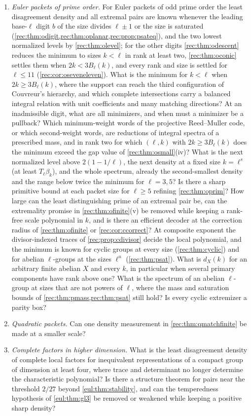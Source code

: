 \begin{enumerate}
\item \emph{Euler packets of prime order.} For Euler packets of odd prime order the least disagreement density and all extremal pairs are known
whenever the leading base-$\ell$ digit $b$ of the size divides $\ell\pm1$ or the size is saturated
(\cref{rec:thm:odigit,rec:thm:oplanar,rec:prop:psateq}), and the two lowest normalized levels by \cref{rec:thm:olevel}; for the other
digits \cref{rec:thm:odescent} reduces the minimum to sizes $k<\ell$ in rank at least two, \cref{rec:thm:oconic} settles
them when $2k<3B_\ell(k)$, and every rank and size is settled for $\ell\le11$ (\cref{rec:cor:oseveneleven}). What is the
minimum for $k<\ell$ when $2k\ge3B_\ell(k)$, where the support can reach the third configuration of Couvreur's
hierarchy, and which complete intersections carry a balanced integral relation with unit coefficients and
many matching directions? At an inadmissible digit, what are all minimizers, and when must a minimizer be a
pullback? Which minimum-weight words of the projective Reed--Muller code, or which second-weight words, are
reductions of integral spectra of a prescribed mass, and in rank two for which $(\ell,k)$ with $2k\ge3B_\ell(k)$ does the
minimum exceed the gap value of \cref{rec:thm:osmall}(iv)? What is the next normalized level above $2(1-1/\ell)$, the next
density at a fixed size $k=\ell^s$ (at least $T_\ell\beta_k$), and the whole spectrum, already the second-smallest density
and the range below twice the minimum for $\ell=3,5$? Is there a sharp primitive bound at each packet size for
$\ell\ge5$ refining \cref{rec:thm:oprim}? How large can the least distinguishing prime of an extremal pair be, can
the extremality promise in \cref{rec:thm:ofinite}(v) be removed while keeping a rank-free scale polynomial in
$k$, and is there an efficient decoder at the correction radius of \cref{rec:thm:ofinite} or
\cref{rec:cor:ccorrect}? At composite exponent the divisor-indexed traces of \cref{rec:prop:cdivisor} decide the
local polynomial, and the minimum is known for cyclic groups at every size (\cref{rec:thm:cyclic}) and for
abelian $\ell$-groups at the sizes $\ell^u$ (\cref{rec:thm:psat}). What is $d_X(k)$ for an arbitrary finite abelian $X$ and every $k$,
in particular when several primary components have rank above one? What is the spectrum of an abelian
$\ell$-group at sizes that are not powers of $\ell$, where the mass and saturation bounds of
\cref{rec:thm:pmass,rec:thm:psat} still hold? Is every cyclic extremizer a parity box?
\item \emph{Quadratic packets.} Can one density measurement in \cref{rec:thm:qmatchfinite} be made at a smaller scale?
\item \emph{Complete factors in higher dimension.} What is the least disagreement density of complete local factors
for inequivalent representations of a compact group of dimension at least four, where trace and determinant no
longer determine the characteristic polynomial? Is there a structure theorem for pairs near the threshold $2/27$
beyond \cref{eul:thm:stability}, and can the temperedness hypothesis of \cref{eul:thm:gl3} be removed or weakened
while keeping a positive sharp density?
\end{enumerate}
